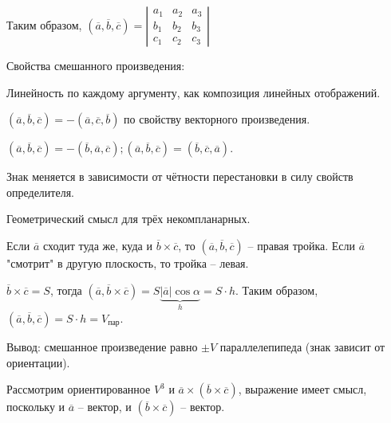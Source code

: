 \begin{Example}
		Таким образом, $(\overline{a}, \overline{b}, \overline{c}) = \left|\begin{array}{cccc}
			a_1  & a_2  & a_3  \\ 
			b_1 &  b_2 & b_3 \\ 
			c_1 & c_2 & c_3
			\end{array}\right|$
	\end{Example}

	Свойства смешанного произведения:
	\begin{MyList}
		\item Линейность по каждому аргументу, как композиция линейных отображений.
		\item $(\overline{a}, \overline{b}, \overline{c}) = - (\overline{a}, \overline{c}, \overline{b})$ по свойству векторного произведения.
		
			  $(\overline{a}, \overline{b}, \overline{c}) = - (\overline{b}, \overline{a}, \overline{c}); (\overline{a}, \overline{b}, \overline{c}) = (\overline{b}, \overline{c}, \overline{a})$.

			  Знак меняется в зависимости от чётности перестановки в силу свойств определителя.
		\item Геометрический смысл для трёх некомпланарных.

			Если $\overline{a}$ сходит туда же, куда и $\overline{b} \times \overline{c}$, то $(\overline{a}, \overline{b}, \overline{c})$ -- правая тройка. Если $\overline{a}$ "смотрит" в другую плоскость, то тройка -- левая.

			$\overline{b} \times \overline{c} = S$, тогда $(\overline{a}, \overline{b} \times \overline{c}) = S \underbrace{|\overline{a}| \cos \alpha}_{h} = S\cdot h$.
			Таким образом, $(\overline{a}, \overline{b}, \overline{c}) = S\cdot h = V_{\text{пар}}$. 

			Вывод: смешанное произведение равно $\pm V$ параллелепипеда (знак зависит от ориентации).
	\end{MyList}
	
	\begin{figure}[h]
		\centering
		\def\svgwidth{0.5\columnwidth}
		
	\end{figure}


	Рассмотрим ориентированное $V^3$ и $\overline{a} \times (\overline{b} \times \overline{c})$, выражение имеет смысл, поскольку и $\overline{a}$ -- вектор, и $(\overline{b} \times \overline{c})$ -- вектор. 

